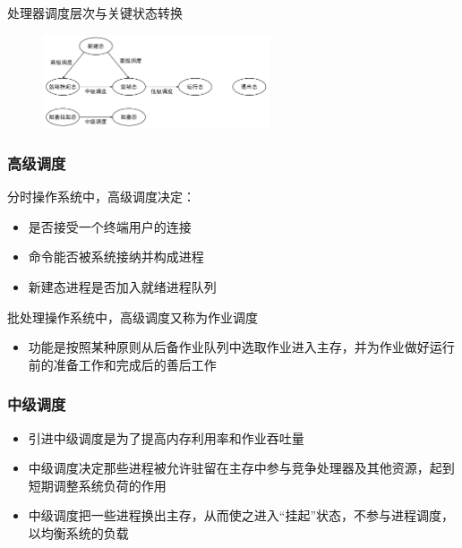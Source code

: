 \documentclass[cs4size,a4paper,10pt]{ctexart}
\begin{document}
	处理器调度层次与关键状态转换
	\begin{figure}[H]
		\centering
		\includegraphics[width=0.6\textwidth]{img/2.5.1.2}
	\end{figure}

	\subsubsection{高级调度}
	分时操作系统中，高级调度决定：
	\begin{itemize}
		\item 是否接受一个终端用户的连接
		\item 命令能否被系统接纳并构成进程
		\item 新建态进程是否加入就绪进程队列
	\end{itemize}

	批处理操作系统中，高级调度又称为作业调度
	\begin{itemize}
		\item 功能是按照某种原则从后备作业队列中选取作业进入主存，并为作业做好运行前的准备工作和完成后的善后工作
	\end{itemize}


	\subsubsection{中级调度}
	\begin{itemize}
		\item 引进中级调度是为了提高内存利用率和作业吞吐量
		\item 中级调度决定那些进程被允许驻留在主存中参与竞争处理器及其他资源，起到短期调整系统负荷的作用
		\item 中级调度把一些进程换出主存，从而使之进入“挂起”状态，不参与进程调度，以均衡系统的负载
	\end{itemize}
\end{document}
